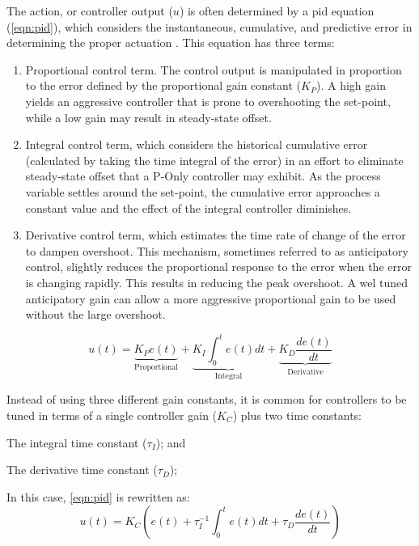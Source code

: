 The action, or controller output ($u$) is often determined by a \acf{pid} equation (\ref{eqn:pid}), which considers the instantaneous, cumulative, and predictive error in determining the proper actuation \cite[Ch. 5]{Bequette}. This equation has three terms:
\begin{enumerate}
\item Proportional control term. The control output is manipulated in proportion to the error defined by the proportional gain constant ($K_P$). A high gain yields an aggressive controller that is prone to overshooting the set-point, while a low gain may result in steady-state offset.  
\item Integral control term, which considers the historical cumulative error (calculated by taking the time integral of the error) in an effort to eliminate steady-state offset that a P-Only controller may exhibit. As the process variable settles around the set-point, the cumulative error approaches a constant value and the effect of the integral controller diminishes.
\item Derivative control term, which estimates the time rate of change of the error to dampen overshoot. This mechanism, sometimes referred to as anticipatory control, slightly reduces the proportional response to the error when the error is changing rapidly. This results in reducing the peak overshoot. A wel tuned anticipatory gain can allow a more aggressive proportional gain to be used without the large overshoot.
\end{enumerate}

\begin{equation}\label{eqn:pid}
    u(t) 
    = \underbrace{K_P e(t)}_{\text{Proportional}} 
    + \underbrace{K_I \int_0^t e(t)dt}_{\text{Integral}} 
    + \underbrace{K_D \frac{de(t)}{dt}}_{\text{Derivative}}
\end{equation}

Instead of using three different gain constants, it is common for controllers to be tuned in terms of a single controller gain ($K_C$) plus two time constants: 
\begin{enumerate*}
    \item The integral time constant ($\tau_I$); and
    \item The derivative time constant ($\tau_D$);
\end{enumerate*}
In this case, \ref{eqn:pid} is rewritten as:
\begin{equation}\label{eqn:pid-tau}
    u(t) = K_C \left( e(t) + \tau_I^{-1} \int_0^t e(t)dt + \tau_D \frac{de(t)}{dt}\right)
\end{equation}

